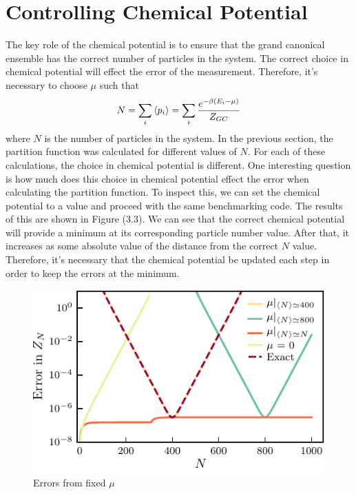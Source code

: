 \section{Controlling Chemical Potential}
The key role of the chemical potential is to ensure that the grand canonical ensemble has the correct number of particles in the system. The correct choice in chemical potential will effect the error of the measurement. Therefore, it's necessary to choose $\mu$ such that 
\begin{equation}
    N=\sum_i \left<{p_i}\right>=\sum_i \frac{e^{-\beta(E_i-\mu)}}{Z_{GC}}
\end{equation}
where $N$ is the number of particles in the system. In the previous section, the partition function was calculated for different values of $N$. For each of these calculations, the choice in chemical potential is different. One interesting question is how much does this choice in chemical potential effect the error when calculating the partition function. To inspect this, we can set the chemical potential to a value and proceed with the same benchmarking code. The results of this are shown in Figure (3.3). We can see that the correct chemical potential will provide a minimum at its corresponding particle number value. After that, it increases as some absolute value of the distance from the correct $N$ value. Therefore, it's necessary that the chemical potential be updated each step in order to keep the errors at the minimum. 

\begin{figure}[H]
    \centering
    \includegraphics[scale=1.5]{figures/pdf/Plot1.pdf}
    \caption{Errors from fixed $\mu$}
    \label{fig:Errors}
\end{figure}

